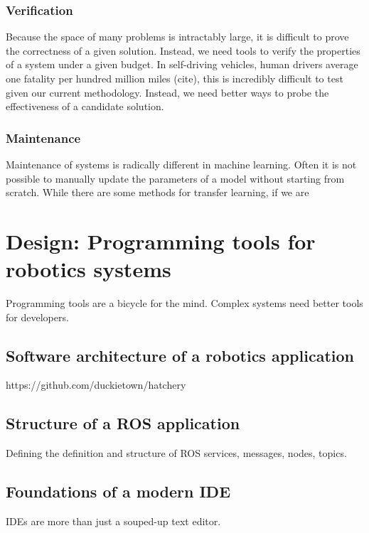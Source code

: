 \documentclass[12pt,initial,twoside,maitrise]{dms}
\numberwithin{equation}{section}
\numberwithin{table}{chapter}
\numberwithin{figure}{chapter}
\begin{document}
\subsection{Verification}

Because the space of many problems is intractably large, it is difficult to prove the correctness of a given solution. Instead, we need tools to verify the properties of a system under a given budget. In self-driving vehicles, human drivers average one fatality per hundred million miles (cite), this is incredibly difficult to test given our current methodology. Instead, we need better ways to probe the effectiveness of a candidate solution.

\subsection{Maintenance}

Maintenance of systems is radically different in machine learning. Often it is not possible to manually update the parameters of a model without starting from scratch. While there are some methods for transfer learning, if we are

\chapter{Design: Programming tools for robotics systems}

Programming tools are a bicycle for the mind. Complex systems need better tools for developers.

\section{Software architecture of a robotics application}

https://github.com/duckietown/hatchery

\section{Structure of a ROS application}

Defining the definition and structure of ROS services, messages, nodes, topics.

\section{Foundations of a modern IDE}

IDEs are more than just a souped-up text editor.
\end{document}
